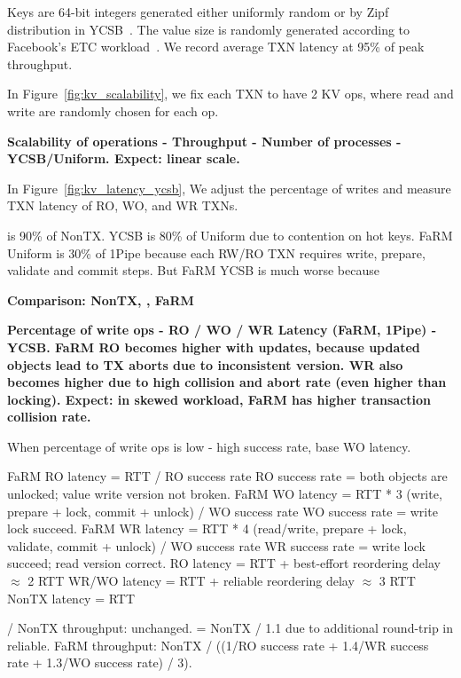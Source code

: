 Keys are 64-bit integers generated either uniformly random or by Zipf distribution in YCSB~\cite{cooper2010benchmarking}.
The value size is randomly generated according to Facebook's ETC workload~\cite{atikoglu2012workload}.
We record average TXN latency at 95\% of peak throughput.


In Figure~\ref{fig:kv_scalability}, we fix each TXN to have 2 KV ops, where read and write are randomly chosen for each op.


\textbf{Scalability of operations - Throughput - Number of processes - YCSB/Uniform. Expect: linear scale.}

In Figure~\ref{fig:kv_latency_ycsb}, We adjust the percentage of writes and measure TXN latency of RO, WO, and WR TXNs.

\sys{} is 90\% of NonTX. YCSB is 80\% of Uniform due to contention on hot keys. FaRM Uniform is 30\% of 1Pipe because each RW/RO TXN requires write, prepare, validate and commit steps. But FaRM YCSB is much worse because

\textbf{Comparison: NonTX, \sys{}, FaRM}

\textbf{Percentage of write ops - RO / WO / WR Latency (FaRM, 1Pipe) - YCSB. FaRM RO becomes higher with updates, because updated objects lead to TX aborts due to inconsistent version. WR also becomes higher due to high collision and abort rate (even higher than locking). Expect: in skewed workload, FaRM has higher transaction collision rate.}

When percentage of write ops is low - high success rate, base WO latency.



FaRM RO latency = RTT / RO success rate
RO success rate = both objects are unlocked; value write version not broken.
FaRM WO latency = RTT * 3 (write, prepare + lock, commit + unlock) / WO success rate
WO success rate = write lock succeed.
FaRM WR latency = RTT * 4 (read/write, prepare + lock, validate, commit + unlock) / WO success rate
WR success rate = write lock succeed; read version correct.
\sys{} RO latency = RTT + best-effort reordering delay $\approx$ 2 RTT
\sys{} WR/WO latency = RTT + reliable reordering delay $\approx$ 3 RTT
NonTX latency = RTT

\sys{} / NonTX throughput: unchanged.
\sys{}  = NonTX / 1.1 due to additional round-trip in reliable.
FaRM throughput: NonTX / ((1/RO success rate + 1.4/WR success rate + 1.3/WO success rate) / 3).

